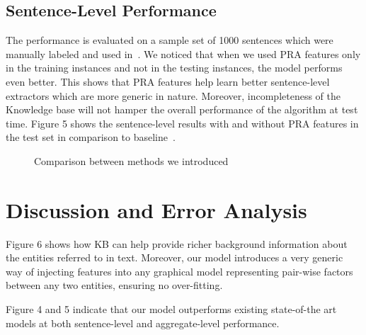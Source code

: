 \documentclass[11pt,a4paper]{article}
\begin{document}
\subsection{Sentence-Level Performance}

The performance is evaluated on a sample set of 1000 sentences which were
manually labeled and used in~\cite{hoffmann-2011-distant-supervision}. We
noticed that when we used PRA features only in the training instances and not
in the testing instances, the model performs even better. This shows that PRA
features help learn better sentence-level extractors which are more generic in
nature. Moreover, incompleteness of the Knowledge base will not hamper the
overall performance of the algorithm at test time. Figure 5 shows the
sentence-level results with and without PRA features in the test set in
comparison to baseline~\cite{hoffmann-2011-distant-supervision}.

\begin{figure}
  \centering
  \caption{Comparison between methods we introduced}
\end{figure}

\section{Discussion and Error Analysis}

Figure 6 shows how KB can help provide richer background information about the
entities referred to in text.  Moreover, our model introduces a very generic
way of injecting features into any graphical model representing pair-wise
factors between any two entities, ensuring no over-fitting.

Figure 4 and 5 indicate that our model outperforms existing state-of-the art
models at both sentence-level and aggregate-level performance.
\end{document}
